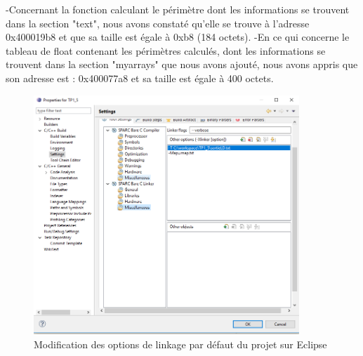\documentclass[12pt,a4paper]{article}
\begin{document}
-Concernant la fonction calculant le périmètre dont les informations se trouvent dans la section "text", nous avons constaté  qu'elle se trouve à l'adresse 0x400019b8 et que sa taille est égale à 0xb8 (184 octets).\newline
-En ce qui concerne le tableau de float contenant les périmètres calculés, dont les informations se trouvent dans la section "myarrays" que nous avons ajouté,  nous avons appris que son adresse est :  0x400077a8 et sa taille est égale à 400 octets.

	\begin{figure}[H]
\includegraphics[width=10cm]{Capture} 

\caption{Modification des options de linkage par défaut du projet sur Eclipse}

	\end{figure}
\end{document}
